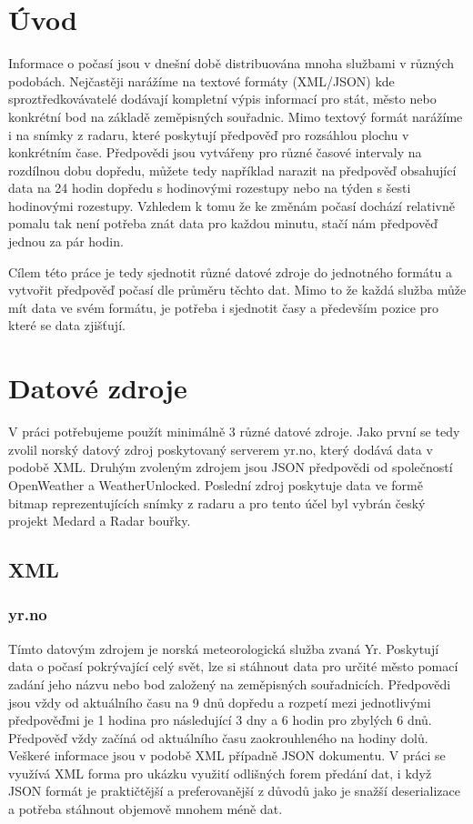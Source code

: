 \documentclass[czech,bachelor,dept460,male,csharp,cpdeclaration]{diploma}
\begin{document}
	
	\MakeTitlePages
	
	\listoffigures
	
	\listoftables
	
	\section{Úvod}	
	
	Informace o počasí jsou v dnešní době distribuována mnoha službami v různých podobách. Nejčastěji narážíme na textové formáty (XML/JSON) kde sproztředkovávatelé dodávají kompletní výpis informací pro stát, město nebo konkrétní bod na základě zeměpisných souřadnic. Mimo textový formát narážíme i na snímky z radaru, které poskytují předpověď pro rozsáhlou plochu v konkrétním čase. Předpovědi jsou vytvářeny pro různé časové intervaly na rozdílnou dobu dopředu, můžete tedy například narazit na předpověď obsahující data na 24 hodin dopředu s hodinovými rozestupy nebo na týden s šesti hodinovými rozestupy. Vzhledem k tomu že ke změnám počasí dochází relativně pomalu tak není potřeba znát data pro každou minutu, stačí nám předpověď jednou za pár hodin.
	
	Cílem této práce je tedy sjednotit různé datové zdroje do jednotného formátu a vytvořit předpověď počasí dle průměru těchto dat. Mimo to že každá služba může mít data ve svém formátu, je potřeba i sjednotit časy a především pozice pro které se data zjišťují. 
	
	\section{Datové zdroje}
	
	V práci potřebujeme použít minimálně 3 různé datové zdroje. Jako první se tedy zvolil norský datový zdroj poskytovaný serverem yr.no, který dodává data v podobě XML. Druhým zvoleným zdrojem jsou JSON předpovědi od společností OpenWeather a WeatherUnlocked. Poslední zdroj poskytuje data ve formě bitmap reprezentujících snímky z radaru a pro tento účel byl vybrán český projekt Medard a Radar bouřky.
	
	\subsection{XML}
	\subsubsection{yr.no}
	
	Tímto datovým zdrojem je norská meteorologická služba zvaná Yr. Poskytují data o počasí pokrývající celý svět, lze si stáhnout data pro určité město pomací zadání jeho názvu nebo bod založený na zeměpisných souřadnicích. Předpovědi jsou vždy od aktuálního času na 9 dnů dopředu a rozpetí mezi jednotlivými předpověďmi je 1 hodina pro následující 3 dny a 6 hodin pro zbylých 6 dnů. Předpověď vždy začíná od aktuálního času zaokrouhleného na hodiny dolů. Veškeré informace jsou v podobě XML případně JSON dokumentu. V práci se využívá XML forma pro ukázku využití odlišných forem předání dat, i když JSON formát je praktičtější a preferovanější z důvodů jako je snažší deserializace a potřeba stáhnout objemově mnohem méně dat.
	
\end{document}
